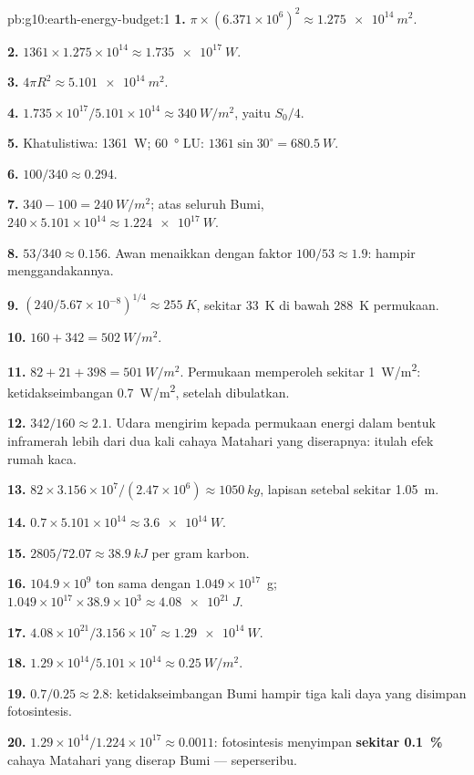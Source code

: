 \begin{solution}{pb:g10:earth-energy-budget:1}
\textbf{1.} $\pi \times (6.371\times10^6)^2 \approx \qty{1.275e14}{m^2}$.

\textbf{2.} $1361 \times 1.275\times10^{14} \approx \qty{1.735e17}{W}$.

\textbf{3.} $4\pi R^2 \approx \qty{5.101e14}{m^2}$.

\textbf{4.} $1.735\times10^{17}/5.101\times10^{14} \approx \qty{340}{W/m^2}$,
yaitu $S_0/4$.

\textbf{5.} Khatulistiwa: \qty{1361}{W}; \qty{60}{\degree} LU: $1361 \sin
30^\circ = \qty{680.5}{W}$.

\textbf{6.} $100/340 \approx 0.294$.

\textbf{7.} $340 - 100 = \qty{240}{W/m^2}$; atas seluruh Bumi, $240 \times
5.101\times10^{14} \approx \qty{1.224e17}{W}$.

\textbf{8.} $53/340 \approx 0.156$. Awan menaikkan  dengan faktor
$100/53 \approx 1.9$: hampir menggandakannya.

\textbf{9.} $(240/5.67\times10^{-8})^{1/4} \approx \qty{255}{K}$, sekitar
\qty{33}{K} di bawah \qty{288}{K} permukaan.

\textbf{10.} $160 + 342 = \qty{502}{W/m^2}$.

\textbf{11.} $82 + 21 + 398 = \qty{501}{W/m^2}$. Permukaan memperoleh sekitar
\qty{1}{W/m^2}: ketidakseimbangan \qty{0.7}{W/m^2}, setelah dibulatkan.

\textbf{12.} $342/160 \approx 2.1$. Udara mengirim kepada permukaan energi
dalam bentuk inframerah lebih dari dua kali cahaya Matahari yang diserapnya:
itulah efek rumah kaca.

\textbf{13.} $82 \times 3.156\times10^7/(2.47\times10^6) \approx
\qty{1050}{kg}$, lapisan setebal sekitar \qty{1.05}{m}.

\textbf{14.} $0.7 \times 5.101\times10^{14} \approx \qty{3.6e14}{W}$.

\textbf{15.} $2805/72.07 \approx \qty{38.9}{kJ}$ per gram karbon.

\textbf{16.} $104.9\times10^9$ ton sama dengan $1.049\times10^{17}$~g;
$1.049\times10^{17} \times 38.9\times10^3 \approx \qty{4.08e21}{J}$.

\textbf{17.} $4.08\times10^{21}/3.156\times10^7 \approx \qty{1.29e14}{W}$.

\textbf{18.} $1.29\times10^{14}/5.101\times10^{14} \approx
\qty{0.25}{W/m^2}$.

\textbf{19.} $0.7/0.25 \approx 2.8$: ketidakseimbangan Bumi hampir tiga kali
daya yang disimpan fotosintesis.

\textbf{20.} $1.29\times10^{14}/1.224\times10^{17} \approx 0.0011$:
fotosintesis menyimpan \textbf{sekitar \qty{0.1}{\percent}} cahaya Matahari
yang diserap Bumi --- seperseribu.
\end{solution}
